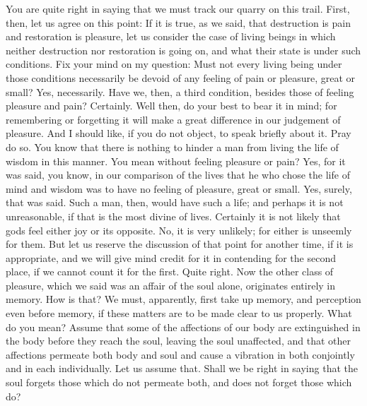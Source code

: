 \documentclass[letterpaper,12pt]{article}
\newcommand{\stephpag}[1]{\marginnote{\small\itshape\fontfamily{ppl}\selectfont #1}}
\begin{document}
\begin{drama}
\protarchusspeaks
You are quite right in saying that we must track our quarry on this trail.
\socratesspeaks
First, then, let us agree on this point: If it is true, \stephpag{e} as we said, that destruction is pain and restoration is pleasure, let us consider the case of living beings in which neither destruction nor restoration is going on, and what their state is under such conditions. Fix your mind on my question: Must not every living being under those conditions necessarily be devoid of any feeling of pain or pleasure, great or small?
\protarchusspeaks
Yes, necessarily.
\socratesspeaks
Have we, then, a third condition, \stephpag{33 a} besides those of feeling pleasure and pain?
\protarchusspeaks
Certainly.
\socratesspeaks
Well then, do your best to bear it in mind; for remembering or forgetting it will make a great difference in our judgement of pleasure. And I should like, if you do not object, to speak briefly about it.
\protarchusspeaks
Pray do so.
\socratesspeaks
You know that there is nothing to hinder a man from living the life of wisdom in this manner. \stephpag{b}
\protarchusspeaks
You mean without feeling pleasure or pain?
\socratesspeaks
Yes, for it was said, you know, in our comparison of the lives that he who chose the life of mind and wisdom was to have no feeling of pleasure, great or small.
\protarchusspeaks
Yes, surely, that was said.
\socratesspeaks
Such a man, then, would have such a life; and perhaps it is not unreasonable, if that is the most divine of lives.
\protarchusspeaks
Certainly it is not likely that gods feel either joy or its opposite.
\socratesspeaks
No, it is very unlikely; for either is unseemly for them. But let us reserve the discussion of that point \stephpag{c} for another time, if it is appropriate, and we will give mind credit for it in contending for the second place, if we cannot count it for the first.
\protarchusspeaks
Quite right.
\socratesspeaks
Now the other class of pleasure, which we said was an affair of the soul alone, originates entirely in memory.
\protarchusspeaks
How is that?
\socratesspeaks
We must, apparently, first take up memory, and perception even before memory, if these matters are to be made clear to us properly. \stephpag{d}
\protarchusspeaks
What do you mean?
\socratesspeaks
Assume that some of the affections of our body are extinguished in the body before they reach the soul, leaving the soul unaffected, and that other affections permeate both body and soul and cause a vibration in both conjointly and in each individually.
\protarchusspeaks
Let us assume that.
\socratesspeaks
Shall we be right in saying that the soul forgets those which do not permeate both, and does not forget those which do? \stephpag{e}

\end{drama}
\end{document}
